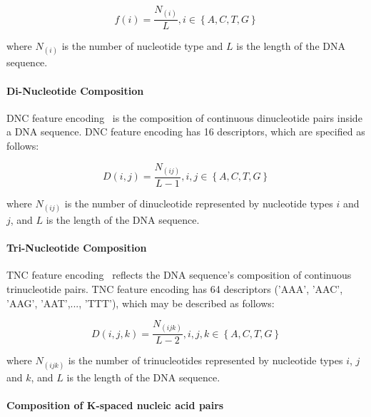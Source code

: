 \begin{equation}\label{eq:NAC}
    f(i) = \frac{N_{(i)}}{L}, i \in \left\{A,C,T,G\right\}
\end{equation}

\noindent where $N_{(i)}$ is the number of nucleotide type and $L$ is the length of the \gls{DNA} sequence.

\paragraph{Di-Nucleotide Composition}

\gls{DNC} feature encoding~\cite{Grabherr2011ExploitingPromoters, Panwar2015IdentificationTri-nucleotides} is the composition of continuous dinucleotide pairs inside a \gls{DNA} sequence. \gls{DNC} feature encoding has 16 descriptors, which are specified as follows:

\begin{equation}\label{eq:DNC}
    D(i,j) = \frac{N_{(ij)}}{L-1}, i,j \in \left\{A,C,T,G\right\}
\end{equation}

\noindent where $N_{(ij)}$ is the number of dinucleotide represented by nucleotide types $i$ and $j$, and $L$ is the length of the \gls{DNA} sequence.

\paragraph{Tri-Nucleotide Composition}

\gls{TNC} feature encoding~\cite{Qiu2014IRSpot-TNCPseAAC:Components,Panwar2014PredictionInformation} reflects the \gls{DNA} sequence's composition of continuous trinucleotide pairs. \gls{TNC} feature encoding has 64 descriptors ('AAA', 'AAC', 'AAG', 'AAT',..., 'TTT'), which may be described as follows:

\begin{equation}\label{eq:TNC}
    D(i,j,k) = \frac{N_{(ijk)}}{L-2}, i,j,k \in \left\{A,C,T,G\right\}
\end{equation}

\noindent where $N_{(ijk)}$ is the number of trinucleotides represented by nucleotide types $i$, $j$ and $k$, and $L$ is the length of the \gls{DNA} sequence.


\paragraph{Composition of K-spaced nucleic acid pairs}

